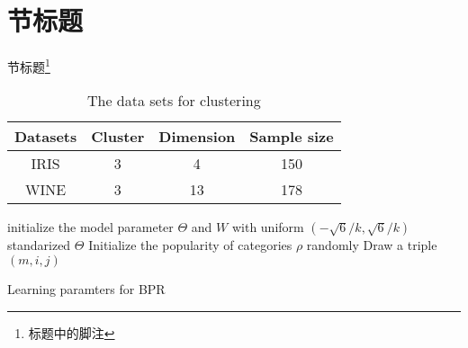 \documentclass{ctexart}
\begin{document}
    \section{节标题}{节标题\protect\footnote{标题中的脚注}}
    \tableofcontents
    \begin{table}[!ht]
        \tabcolsep=10pt
        \centering
        \caption{The data sets for clustering}
        \begin{tabular}{c c c c}
        \hline
        \hline
        Datasets & Cluster & Dimension & Sample size\\ \hline
        IRIS	 & 3	   &   4	   &   150\\
        WINE	 & 3	   &   13	   &   178\\ \hline
        \hline
        \end{tabular}
        \label{tab:1}
    \end{table}
        \IncMargin{1em} %
    \begin{algorithm}

        \SetAlgoNoLine %

        \BlankLine

        initialize the model parameter $\Theta$ and $W$ with uniform $\left(-\sqrt{6}/{k},\sqrt{6}/{k}\right)$\; 
        standarized $\Theta$\;
        Initialize the popularity of categories $\rho$ randomly\;
        \Repeat
            {}
            {Draw a triple $\left(m,i,j\right)$\;
            }
        \caption{Learning paramters for BPR\label{al3}}
    \end{algorithm}
    \DecMargin{1em}
\end{document}
